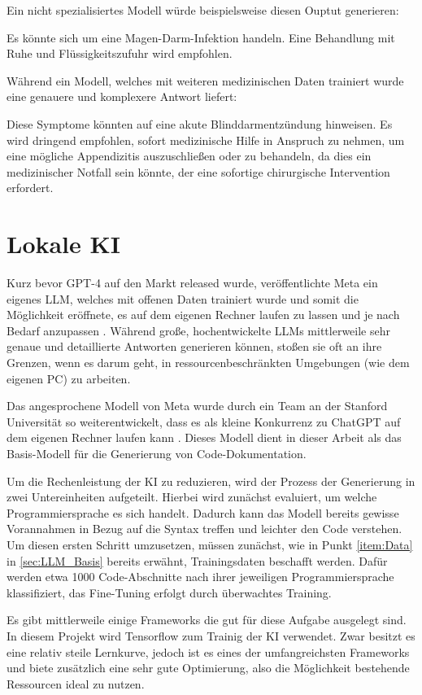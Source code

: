 \documentclass[11pt,a4paper]{report}
\begin{document}
Ein nicht spezialisiertes Modell würde beispielsweise diesen Ouptut generieren:

\glqq Es könnte sich um eine Magen-Darm-Infektion handeln. Eine
Behandlung mit Ruhe und Flüssigkeitszufuhr wird empfohlen. \grqq{}

Während ein Modell, welches mit weiteren medizinischen Daten trainiert wurde eine genauere und komplexere Antwort liefert:

\glqq Diese Symptome könnten auf eine akute Blinddarmentzündung hinweisen. Es
wird dringend empfohlen, sofort medizinische Hilfe in Anspruch zu
nehmen, um eine mögliche Appendizitis auszuschließen oder zu behandeln,
da dies ein medizinischer Notfall sein könnte, der eine sofortige
chirurgische Intervention erfordert.\grqq{}

\section{Lokale KI}

Kurz bevor GPT-4 auf den Markt released wurde, veröffentlichte Meta ein eigenes LLM, welches mit offenen Daten trainiert wurde und somit die Möglichkeit eröffnete, es auf dem eigenen Rechner laufen zu lassen und je nach Bedarf anzupassen \cite{Winkler}. Während große, hochentwickelte LLMs mittlerweile sehr genaue und detaillierte Antworten generieren können, stoßen sie oft an ihre Grenzen, wenn es darum geht, in ressourcenbeschränkten Umgebungen (wie dem eigenen PC) zu arbeiten.

Das angesprochene Modell von Meta wurde durch ein Team an der Stanford Universität so weiterentwickelt, dass es als kleine Konkurrenz zu ChatGPT auf dem eigenen Rechner laufen kann \cite{Winkler}. Dieses Modell dient in dieser Arbeit als das Basis-Modell für die Generierung von Code-Dokumentation.

Um die Rechenleistung der KI zu reduzieren, wird der Prozess der Generierung in zwei Untereinheiten aufgeteilt. Hierbei wird zunächst evaluiert, um welche Programmiersprache es sich handelt. Dadurch kann das Modell bereits gewisse Vorannahmen in Bezug auf die Syntax treffen und leichter den Code verstehen. Um diesen ersten Schritt umzusetzen, müssen zunächst, wie in Punkt \ref{item:Data} in \ref{sec:LLM_Basis} bereits erwähnt, Trainingsdaten beschafft werden. Dafür werden etwa 1000 Code-Abschnitte nach ihrer jeweiligen Programmiersprache klassifiziert, das Fine-Tuning erfolgt durch überwachtes Training.

Es gibt mittlerweile einige Frameworks die gut für diese Aufgabe ausgelegt sind. In diesem Projekt wird Tensorflow zum Trainig der KI verwendet. Zwar besitzt es eine relativ steile Lernkurve, jedoch ist es eines der umfangreichsten Frameworks und biete zusätzlich eine sehr gute Optimierung, also die Möglichkeit bestehende Ressourcen ideal zu nutzen.
\end{document}
